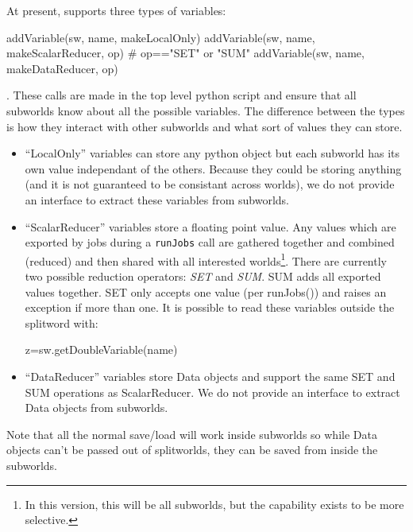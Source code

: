 \begin{description}
At present, \escript supports three types of variables:
\begin{python}
addVariable(sw, name, makeLocalOnly)
addVariable(sw, name, makeScalarReducer, op) # op=="SET" or "SUM"
addVariable(sw, name, makeDataReducer, op)
\end{python}
. 
These calls are made in the top level python script and ensure that all subworlds know about all the possible variables.
The difference between the types is how they interact with other subworlds and what sort of values they can store.
\begin{itemize}
 \item ``LocalOnly'' variables can store any python object but each subworld has its own value independant of the others.
 Because they could be storing anything (and it is not guaranteed to be consistant across worlds), we do not provide an 
 interface to extract these variables from subworlds.
 \item ``ScalarReducer'' variables store a floating point value.
Any values which are exported by jobs during a \texttt{runJobs} call are gathered together and combined (reduced) and then 
shared with all interested worlds\footnote{
In this version, this will be all subworlds, but the capability exists to be 
more selective.}.
  There are currently two possible reduction operators: \emph{SET} and \emph{SUM}.
  SUM adds all exported values together.
  SET only accepts one value (per runJobs()) and raises an exception if more than one.
It is possible to read these variables outside the splitword with:
\begin{python}
 z=sw.getDoubleVariable(name)
\end{python}
\item ``DataReducer'' variables store Data objects and support the same SET and SUM operations as ScalarReducer.
We do not provide an interface to extract Data objects from subworlds.
\end{itemize}

Note that all the normal save/load will work inside subworlds so while Data objects can't be passed out of splitworlds, 
they can be saved from inside the subworlds.

\end{description}

